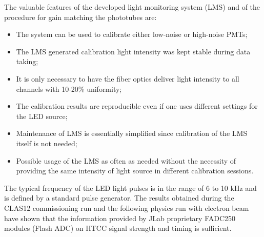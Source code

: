 The valuable features of the developed light monitoring system (LMS) and of the procedure for gain matching the phototubes are:
 
 \begin{itemize}
     \item The system can be used to calibrate either low-noise or high-noise PMTs;
     \item The LMS generated calibration light intensity was kept stable during data taking;
     \item It is only necessary to have the fiber optics deliver light intensity to all channels with 10-20\% uniformity;
     \item The calibration results are reproducible even if one uses different settings for the LED source;
     \item Maintenance of LMS is essentially simplified since calibration of the LMS itself is not needed;
     \item Possible usage of the LMS as often as needed without the necessity of providing the same intensity of light source in different calibration sessions.
 \end{itemize}

\indent The typical frequency of the LED light pulses is in the range of 6 to 10 kHz and is defined by a standard pulse generator. The results obtained during the CLAS12 commissioning run and the following physics run with electron beam have shown that the information provided by JLab proprietary FADC250 modules (Flash ADC) on HTCC signal strength and timing is sufficient. 

